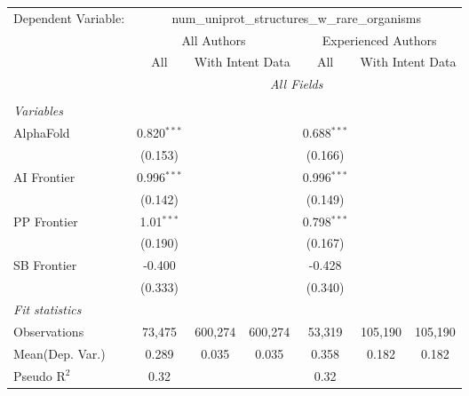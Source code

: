 \begingroup
\centering
\begin{tabular}{lcccccc}
   \tabularnewline \midrule \midrule
   Dependent Variable: & \multicolumn{6}{c}{num\_uniprot\_structures\_w\_rare\_organisms}\\
 & \multicolumn{3}{c}{All Authors} & \multicolumn{3}{c}{Experienced Authors} \\
\cmidrule(lr){2-4} \cmidrule(lr){5-7}
 & \multicolumn{1}{c}{All} & \multicolumn{2}{c}{With Intent Data} & \multicolumn{1}{c}{All} & \multicolumn{2}{c}{With Intent Data} \\
\cmidrule(lr){2-2} \cmidrule(lr){3-4} \cmidrule(lr){5-5} \cmidrule(lr){6-7}
 & \multicolumn{6}{c}{\textit{All Fields}} \\ \\
   \emph{Variables}\\
   AlphaFold    & 0.820$^{***}$ &         &         & 0.688$^{***}$ &         &   \\   
                & (0.153)       &         &         & (0.166)       &         &   \\   
   AI Frontier  & 0.996$^{***}$ &         &         & 0.996$^{***}$ &         &   \\   
                & (0.142)       &         &         & (0.149)       &         &   \\   
   PP Frontier  & 1.01$^{***}$  &         &         & 0.798$^{***}$ &         &   \\   
                & (0.190)       &         &         & (0.167)       &         &   \\   
   SB Frontier  & -0.400        &         &         & -0.428        &         &   \\   
                & (0.333)       &         &         & (0.340)       &         &   \\   
   \midrule
   \emph{Fit statistics}\\
   Observations & 73,475        & 600,274 & 600,274 & 53,319        & 105,190 & 105,190\\  
Mean(Dep. Var.) & 0.289 & 0.035 & 0.035 & 0.358 & 0.182 & 0.182 \\
   Pseudo R$^2$ & 0.32          &         &         & 0.32          &         & \\  
   

\end{tabular}
